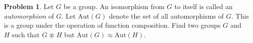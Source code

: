 \documentclass[12pt,reqno]{article}
\theoremstyle{plain}
\theoremstyle{definition}
\newtheorem{problem}{Problem}
\begin{document}
\newpage


\begin{problem} Let $G$ be a group. An isomorphism from $G$ to itself is called an \emph{automorphism} of $G$. Let $\mathrm{Aut}(G)$ denote the set of all automorphisms of $G$. This is a group under the operation of function composition.
    Find two groups $G$ and $H$ such that $G \not \approx H$ but $\mathrm{Aut}(G) \approx \mathrm{Aut}(H)$.
\end{problem}
\end{document}
